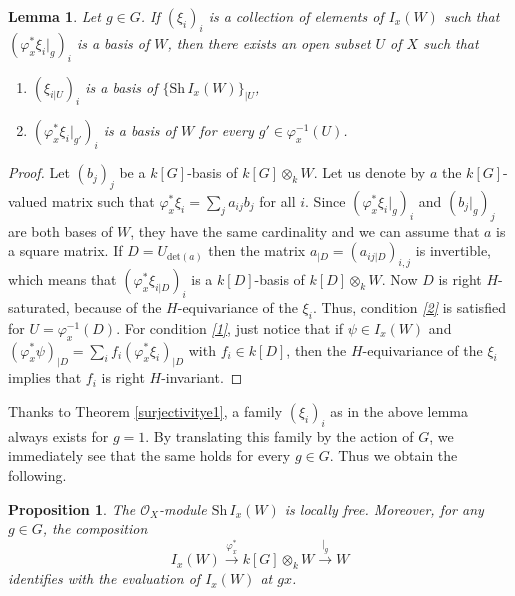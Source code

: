 \documentclass{amsart}
\newtheorem{proposition}[theorem]{Proposition}
\newtheorem{lemma}[theorem]{Lemma}
\theoremstyle{definition}
\begin{document}
\begin{lemma}
    Let $g \in G$. If $(\xi_i)_i$ is a collection of elements of $I_x(W)$ such that $(\varphi_x^*\xi_i|_g)_i$ is a basis of $W$, then there exists an open subset $U$ of $X$ such that
    \begin{enumerate}[label = (\roman*)]
        \item \label{1} $(\xi_{i | U})_i$ is a basis of $\{\mathrm{Sh}\, I_x(W)\}_{|U}$,
        \item \label{2} $(\varphi_x^*\xi_i|_{g'})_i$ is a basis of $W$ for every $g' \in \varphi_x^{-1}(U)$.
    \end{enumerate}
\end{lemma}
\begin{proof}
    Let $(b_j)_j$ be a $k[G]$-basis of $k[G]\otimes_k W$. Let us denote by $a$ the $k[G]$-valued matrix such that $\varphi_x^*\xi_i = \sum_j a_{ij}b_j$ for all $i$. Since $(\varphi_x^*\xi_i|_g)_i$ and $(b_j|_g)_j$ are both bases of $W$, they have the same cardinality and we can assume that $a$ is a square matrix.
    If $D = U_{\mathrm{det}(a)}$ then the matrix $a_{|D} = (a_{ij|D})_{i,j}$ is invertible, which means that $(\varphi_x^*\xi_{i|D})_i$ is a $k[D]$-basis of $k[D]\otimes_k W$. Now $D$ is right $H$-saturated, because of the $H$-equivariance of the $\xi_i$. Thus, condition \textit{\ref{2}} is satisfied for $U = \varphi_x^{-1}(D)$. For condition \textit{\ref{1}}, just notice that if $\psi \in I_x(W)$ and $(\varphi_x^*\psi)_{|D} = \sum_i f_i (\varphi_x^*\xi_i)_{|D}$ with $f_i \in k[D]$, then the $H$-equivariance of the $\xi_i$ implies that $f_i$ is right $H$-invariant.
\end{proof}

Thanks to Theorem \ref{surjectivitye1}, a family $(\xi_i)_i$ as in the above lemma always exists for $g=1$. By translating this family by the action of $G$, we immediately see that the same holds for every $g \in G$. Thus we obtain the following.

\begin{proposition}\label{ponctuel}
    The $\mathscr{O}_X$-module $\mathrm{Sh}\,I_x(W)$ is locally free. Moreover, for any $g \in G$, the composition
\begin{equation}
    I_x(W) \xrightarrow{\varphi_x^*} k[G] \otimes_k W \xrightarrow{|_{g}} W
\end{equation}
identifies with the evaluation of $I_x(W)$ at $gx$.
\end{proposition}

\end{document}
